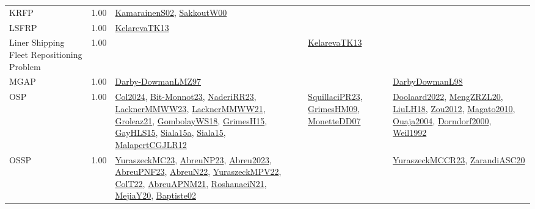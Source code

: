 {\begin{longtable}{p{3cm}r>{\raggedright\arraybackslash}p{6cm}>{\raggedright\arraybackslash}p{6cm}>{\raggedright\arraybackslash}p{8cm}}
\index{KRFP}\index{Classification!KRFP}KRFP &  1.00 & \hyperref[detail:KamarainenS02]{KamarainenS02}, \hyperref[detail:SakkoutW00]{SakkoutW00} &  & \\
\index{LSFRP}\index{Classification!LSFRP}LSFRP &  1.00 & \hyperref[detail:KelarevaTK13]{KelarevaTK13} &  & \\
\index{Liner Shipping Fleet Repositioning Problem}\index{Classification!Liner Shipping Fleet Repositioning Problem}Liner Shipping Fleet Repositioning Problem &  1.00 &  & \hyperref[detail:KelarevaTK13]{KelarevaTK13} & \\
\index{MGAP}\index{Classification!MGAP}MGAP &  1.00 & \hyperref[detail:Darby-DowmanLMZ97]{Darby-DowmanLMZ97} &  & \hyperref[detail:DarbyDowmanL98]{DarbyDowmanL98}\\
\index{OSP}\index{Classification!OSP}OSP &  1.00 & \hyperref[detail:Col2024]{Col2024}, \hyperref[detail:Bit-Monnot23]{Bit-Monnot23}, \hyperref[detail:NaderiRR23]{NaderiRR23}, \hyperref[detail:LacknerMMWW23]{LacknerMMWW23}, \hyperref[detail:LacknerMMWW21]{LacknerMMWW21}, \hyperref[detail:Groleaz21]{Groleaz21}, \hyperref[detail:GombolayWS18]{GombolayWS18}, \hyperref[detail:GrimesH15]{GrimesH15}, \hyperref[detail:GayHLS15]{GayHLS15}, \hyperref[detail:Siala15a]{Siala15a}, \hyperref[detail:Siala15]{Siala15}, \hyperref[detail:MalapertCGJLR12]{MalapertCGJLR12} & \hyperref[detail:SquillaciPR23]{SquillaciPR23}, \hyperref[detail:GrimesHM09]{GrimesHM09}, \hyperref[detail:MonetteDD07]{MonetteDD07} & \hyperref[detail:Doolaard2022]{Doolaard2022}, \hyperref[detail:MengZRZL20]{MengZRZL20}, \hyperref[detail:LiuLH18]{LiuLH18}, \hyperref[detail:Zou2012]{Zou2012}, \hyperref[detail:Magato2010]{Magato2010}, \hyperref[detail:Ouaja2004]{Ouaja2004}, \hyperref[detail:Dorndorf2000]{Dorndorf2000}, \hyperref[detail:Weil1992]{Weil1992}\\
\index{OSSP}\index{Classification!OSSP}OSSP &  1.00 & \hyperref[detail:YuraszeckMC23]{YuraszeckMC23}, \hyperref[detail:AbreuNP23]{AbreuNP23}, \hyperref[detail:Abreu2023]{Abreu2023}, \hyperref[detail:AbreuPNF23]{AbreuPNF23}, \hyperref[detail:AbreuN22]{AbreuN22}, \hyperref[detail:YuraszeckMPV22]{YuraszeckMPV22}, \hyperref[detail:ColT22]{ColT22}, \hyperref[detail:AbreuAPNM21]{AbreuAPNM21}, \hyperref[detail:RoshanaeiN21]{RoshanaeiN21}, \hyperref[detail:MejiaY20]{MejiaY20}, \hyperref[detail:Baptiste02]{Baptiste02} &  & \hyperref[detail:YuraszeckMCCR23]{YuraszeckMCCR23}, \hyperref[detail:ZarandiASC20]{ZarandiASC20}\\

\end{longtable}}
